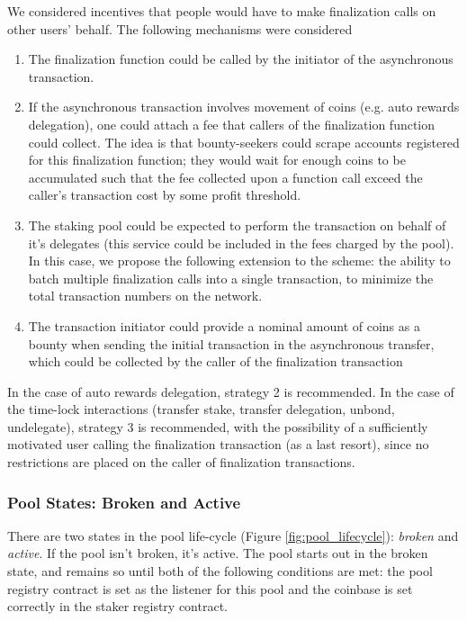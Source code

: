 We considered incentives that people would have to make finalization calls on other users' behalf. The following mechanisms were considered
\begin{enumerate}
    \item The finalization function could be called by the initiator of the asynchronous transaction. 
    \item If the asynchronous transaction involves movement of coins (e.g. auto rewards delegation), one could attach a fee that callers of the finalization function could collect. The idea is that bounty-seekers could scrape accounts registered for this finalization function; they would wait for enough coins to be accumulated such that the fee collected upon a function call exceed the caller's transaction cost by some profit threshold. 
    \item The staking pool could be expected to perform the transaction on behalf of it's delegates (this service could be included in the fees charged by the pool). In this case, we propose the following extension to the scheme: the ability to batch multiple finalization calls into a single transaction, to minimize the total transaction numbers on the network. 
    \item The transaction initiator could provide a nominal amount of coins as a bounty when sending the initial transaction in the asynchronous transfer, which could be collected by the caller of the finalization transaction
\end{enumerate}

In the case of auto rewards delegation, strategy 2 is recommended. In the case of the time-lock interactions (transfer stake, transfer delegation, unbond, undelegate), strategy 3 is recommended, with the possibility of a sufficiently motivated user calling the finalization transaction (as a last resort), since no restrictions are placed on the caller of finalization transactions. 

\subsubsection{Pool States: Broken and Active} \label{pool_states}

There are two states in the pool life-cycle (Figure \ref{fig:pool_lifecycle}): \textit{broken} and \textit{active}. If the pool isn't broken, it's active. The pool starts out in the broken state, and remains so until both of the following conditions are met: the pool registry contract is set as the listener for this pool and the coinbase is set correctly in the staker registry contract. 

